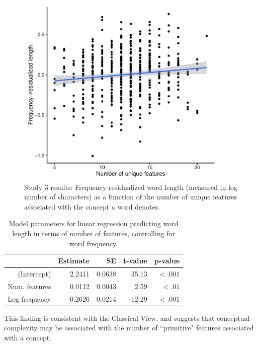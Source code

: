   \begin{figure}[t!]
 \begin{center}
  \includegraphics[width=4in]{figs/feature_plot.pdf}
  \caption{\label{fig:feature_plot} Study 3 results: Frequency-residualized word length (measured in log number of characters) as a function of the number of unique features associated with the concept a word denotes. }
 \end{center}
\end{figure}

\begin{table}[t!]
\centering
\begin{tabular}{rrrrr}
  \hline
 & Estimate & SE & t-value & p-value \\ 
  \hline
(Intercept) & 2.2411 & 0.0638 & 35.13 & $<.001$ \\ 
  Num. features & 0.0112 & 0.0043 & 2.59 & $<.01$\\ 
  Log frequency & -0.2626 & 0.0214 & -12.29 & $<.001$  \\ 
   \hline
\end{tabular}
\caption{Model parameters for linear regression predicting word length in terms of number of features, controlling for word frequency.}
\label{study3amodel}
\end{table}

This finding is consistent with the Classical View, and suggests that conceptual complexity may be associated with the number of ``primitive" features associated with a concept.

